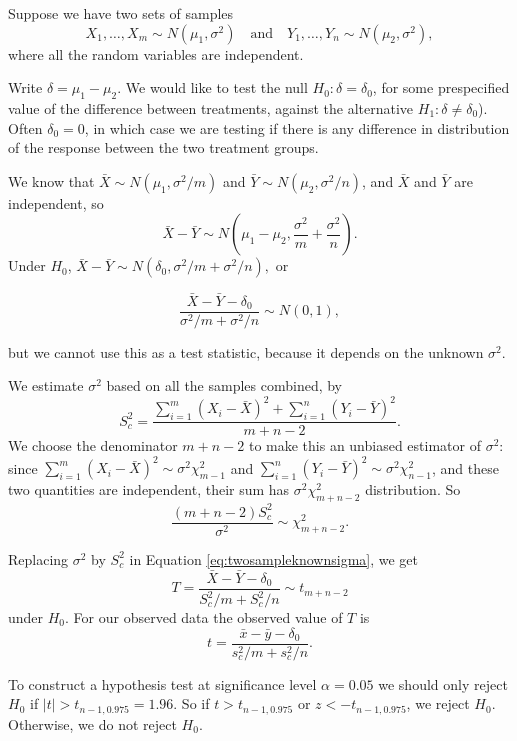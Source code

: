 \documentclass[]{book}
\theoremstyle{definition}
\theoremstyle{definition}
\theoremstyle{definition}
\theoremstyle{remark}
\let\BeginKnitrBlock\begin \let\EndKnitrBlock\end
\begin{document}
\BeginKnitrBlock{example}[Classical two-sample $t$-test]
\protect\hypertarget{exm:twosamplet}{}{\label{exm:twosamplet}
\iffalse (Classical two-sample \(t\)-test) \fi{} }Suppose we have two
sets of samples
\[X_1, \ldots, X_{m} \sim N(\mu_1, \sigma^2) \quad \text{and} \quad
Y_1, \ldots, Y_{n} \sim N(\mu_2, \sigma^2),\] where all the random
variables are independent.

Write \(\delta = \mu_1 - \mu_2\). We would like to test the null
\(H_0: \delta = \delta_0\), for some prespecified value of the
difference between treatments, against the alternative
\(H_1: \delta \not = \delta_0\)). Often \(\delta_0 = 0\), in which case
we are testing if there is any difference in distribution of the
response between the two treatment groups.

We know that \(\bar X \sim N(\mu_1, \sigma^2/m)\) and
\(\bar Y \sim N(\mu_2, \sigma^2/n)\), and \(\bar X\) and \(\bar Y\) are
independent, so \[\bar X - \bar Y \sim N\left(\mu_1 - \mu_2, 
\frac{\sigma^2}{m}+ \frac{\sigma^2}{n}\right).\] Under \(H_0\),
\(\bar X - \bar Y \sim N(\delta_0, \sigma^2/m+ \sigma^2/n),\) or

\begin{equation}
\frac{\bar X - \bar Y - \delta_0}{\sigma^2/m+ \sigma^2/n}
\sim N(0, 1),
\label{eq:twosampleknownsigma}
\end{equation}

but we cannot use this as a test statistic, because it depends on the
unknown \(\sigma^2\).

We estimate \(\sigma^2\) based on all the samples combined, by
\[S_c^2 = \frac{\sum_{i=1}^{m} (X_i - \bar X)^2 + 
\sum_{i=1}^{n}(Y_i - \bar Y)^2}{m + n - 2}.\] We choose the denominator
\(m + n - 2\) to make this an unbiased estimator of \(\sigma^2\): since
\(\sum_{i=1}^{m} (X_i - \bar X)^2 \sim \sigma^2 \chi^2_{m - 1}\) and
\(\sum_{i=1}^{n} (Y_i - \bar Y)^2 \sim \sigma^2 \chi^2_{n - 1}\), and
these two quantities are independent, their sum has
\(\sigma^2 \chi^2_{m + n - 2}\) distribution. So
\[\frac{(m + n - 2)S_c^2}{\sigma^2} \sim \chi^2_{m + n - 2}.\]

Replacing \(\sigma^2\) by \(S_c^2\) in Equation
\eqref{eq:twosampleknownsigma}, we get
\[T = \frac{\bar X - \bar Y - \delta_0}{S_c^2 / m+ S_c^2 / n}
\sim t_{m + n - 2}\] under \(H_0\). For our observed data the observed
value of \(T\) is
\[t = \frac{\bar x - \bar y - \delta_0}{s_c^2 / m+ s_c^2 / n}.\]

To construct a hypothesis test at significance level \(\alpha = 0.05\)
we should only reject \(H_0\) if \(|t| > t_{n-1, 0.975} = 1.96\). So if
\(t > t_{n-1, 0.975}\) or \(z < -t_{n-1, 0.975}\), we reject \(H_0\).
Otherwise, we do not reject \(H_0\).
\EndKnitrBlock{example}
\end{document}
